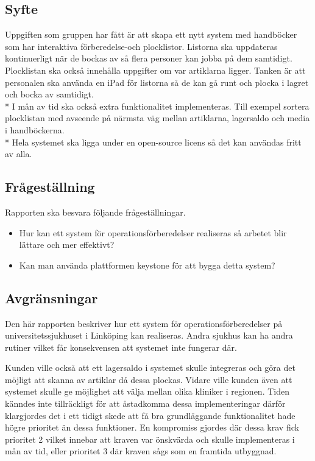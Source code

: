 \documentclass{article}
\begin{document}
\subsection{Syfte}
Uppgiften som gruppen har fått är att skapa ett nytt system med handböcker som har interaktiva förberedelse-och plocklistor. Listorna ska uppdateras kontinuerligt när de bockas av så flera personer kan jobba på dem samtidigt. Plocklistan ska också innehålla uppgifter om var artiklarna ligger. Tanken är att personalen 
ska använda en iPad för listorna så de kan gå runt och plocka i lagret och bocka av samtidigt. \\*
I mån av tid ska också extra funktionalitet implementeras. Till exempel sortera plocklistan med avseende på närmsta väg mellan artiklarna, lagersaldo och media i handböckerna. \\*
Hela systemet ska ligga under en open-source licens så det kan användas fritt av alla.    
\subsection{Frågeställning}
Rapporten ska besvara följande frågeställningar.
\begin{itemize}
\item Hur kan ett system för operationsförberedelser realiseras så arbetet blir lättare och mer effektivt?
\item Kan man använda plattformen keystone för att bygga detta system?
 
\end{itemize}

\subsection{Avgränsningar}
Den här rapporten beskriver hur ett system för operationsförberedelser på universitetssjukhuset i Linköping kan realiseras. Andra sjukhus kan ha andra rutiner vilket får konsekvensen att systemet inte fungerar där.

Kunden ville också att ett lagersaldo i systemet skulle integreras och göra det möjligt att skanna av artiklar då dessa plockas. Vidare ville kunden även att systemet skulle ge möjlighet att välja mellan olika kliniker i regionen. Tiden känndes inte tillräckligt för att åstadkomma dessa implementeringar därför klargjordes det i ett tidigt skede att få bra grundläggande funktionalitet hade högre prioritet än dessa funktioner. En kompromiss gjordes där dessa krav fick prioritet 2 vilket innebar att kraven var önskvärda och skulle implementeras i mån av tid, eller prioritet 3 där kraven sågs som en framtida utbyggnad.
\end{document}
